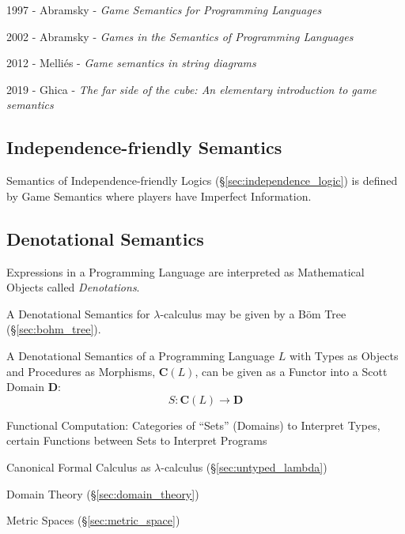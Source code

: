 1997 - Abramsky - \emph{Game Semantics for Programming Languages}

2002 - Abramsky - \emph{Games in the Semantics of Programming Languages}

2012 - Melli\'es - \emph{Game semantics in string diagrams}

2019 - Ghica - \emph{The far side of the cube: An elementary introduction to
  game semantics}



\subsection{Independence-friendly Semantics}
\label{sec:independence_semantics}

Semantics of Independence-friendly Logics
(\S\ref{sec:independence_logic}) is defined by Game Semantics where
players have Imperfect Information.



\subsection{Denotational Semantics}\label{sec:denotational_semantics}

Expressions in a Programming Language are interpreted as Mathematical
Objects called \emph{Denotations}.

A Denotational Semantics for $\lambda$-calculus may be given by a
B\"om Tree (\S\ref{sec:bohm_tree}).

A Denotational Semantics of a Programming Language $L$ with Types as
Objects and Procedures as Morphisms, $\mathbf{C}(L)$, can be given as
a Functor into a Scott Domain $\mathbf{D}$: \cite{awodey06}
\[
  S : \mathbf{C}(L) \rightarrow \mathbf{D}
\]

Functional Computation: Categories of ``Sets'' (Domains) to Interpret
Types, certain Functions between Sets to Interpret Programs

Canonical Formal Calculus as $\lambda$-calculus
(\S\ref{sec:untyped_lambda})

Domain Theory (\S\ref{sec:domain_theory})

Metric Spaces (\S\ref{sec:metric_space})

